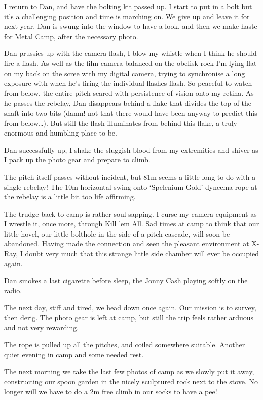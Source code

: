 I return to Dan, and have the bolting kit passed up. I start to put in a
bolt but it's a challenging position and time is marching on. We give up
and leave it for next year. Dan is swung into the window to have a look,
and then we make haste for Metal Camp, after the necessary photo.

Dan prussics up with the camera flash, I blow my whistle when I think he
should fire a flash. As well as the film camera balanced on the obelisk
rock I'm lying flat on my back on the scree with my digital camera,
trying to synchronise a long exposure with when he's firing the
individual flashes flash. So peaceful to watch from below, the entire
pitch seared with persistence of vision onto my retina. As he passes the
rebelay, Dan disappears behind a flake that divides the top of the shaft
into two bits (damn! not that there would have been anyway to predict
this from below\ldots{}). But still the flash illuminates from behind
this flake, a truly enormous and humbling place to be.

Dan successfully up, I shake the sluggish blood from my extremities and
shiver as I pack up the photo gear and prepare to climb.

The pitch itself passes without incident, but 81m seems a little long to
do with a single rebelay! The 10m horizontal swing onto `Spelenium Gold'
dyneema rope at the rebelay is a little bit too life affirming.

The trudge back to camp is rather soul sapping. I curse my camera
equipment as I wrestle it, once more, through Kill 'em All. Sad times at
camp to think that our little hovel, our little bolthole in the side of
a pitch cascade, will soon be abandoned. Having made the connection and
seen the pleasant environment at X-Ray, I doubt very much that this
strange little side chamber will ever be occupied again.

Dan smokes a last cigarette before sleep, the Jonny Cash playing softly
on the radio.

The next day, stiff and tired, we head down once again. Our mission is
to survey, then derig. The photo gear is left at camp, but still the
trip feels rather arduous and not very rewarding.

The rope is pulled up all the pitches, and coiled somewhere suitable.
Another quiet evening in camp and some needed rest.

The next morning we take the last few photos of camp as we slowly put it
away, constructing our spoon garden in the nicely sculptured rock next
to the stove. No longer will we have to do a 2m free climb in our socks
to have a pee!

